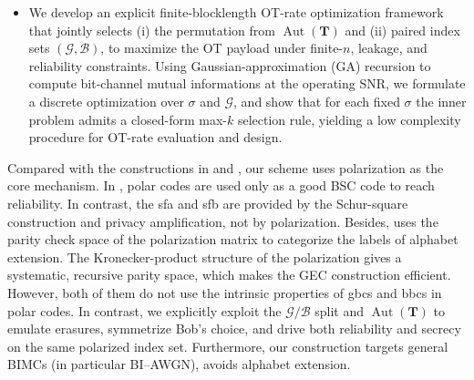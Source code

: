 \documentclass[onecolumn]{IEEEtran} %
\newcommand{\1}{\mathbbm{1}}
\DeclareMathOperator{\Aut}{Aut}
\theoremstyle{boldremark}
\newcommand{\bT}{\mathbf{T}}
\begin{document}
\begin{itemize}
 \item[(5)] We develop an explicit finite-blocklength OT-rate optimization
  framework that jointly selects (i) the permutation from $\Aut(\bT)$
  and (ii) paired index sets $(\mathcal G,\mathcal B)$, to maximize the OT payload under
  finite-$n$, leakage, and reliability constraints.
  Using Gaussian-approximation (GA) recursion to compute bit-channel mutual
  informations at the operating SNR, we formulate a discrete optimization over
  $\sigma$ and $\mathcal G$, and show that for each fixed $\sigma$ the inner
  problem admits a closed-form max-$k$ selection rule,
  yielding a low complexity procedure for OT-rate evaluation and design.
\end{itemize}



Compared with the constructions in \cite{OggierZemor22} and \cite{SudaWatanabe25}, our scheme uses polarization as the core mechanism. In \cite{OggierZemor22}, polar codes are used only as a good BSC code to reach reliability. In contrast, the \gls{sfa} and \gls{sfb} are provided by the Schur-square construction and privacy amplification, not by polarization. Besides, \cite{SudaWatanabe25} uses the parity check space of the polarization matrix to categorize the labels of alphabet extension. The Kronecker-product structure of the polarization gives a systematic, recursive parity space, which makes the GEC construction efficient. However, both of them do not use the intrinsic properties of \gls{gbcs} and \gls{bbcs} in polar codes. In contrast, we explicitly exploit the $\mathcal{G}/\mathcal{B}$ split and $\Aut(\mathbf{T})$ to emulate erasures, symmetrize Bob’s choice, and drive both reliability and secrecy on the same polarized index set. Furthermore, our construction targets general BIMCs (in particular BI--AWGN), avoids alphabet extension. 







\newcommand{\oz}{Oggier--Z{\'e}mor~\cite{OggierZemor22}}
\newcommand{\sw}{Suda--Watanabe~\cite{SudaWatanabe25}}
\newcommand{\ours}{This work}

\end{document}
